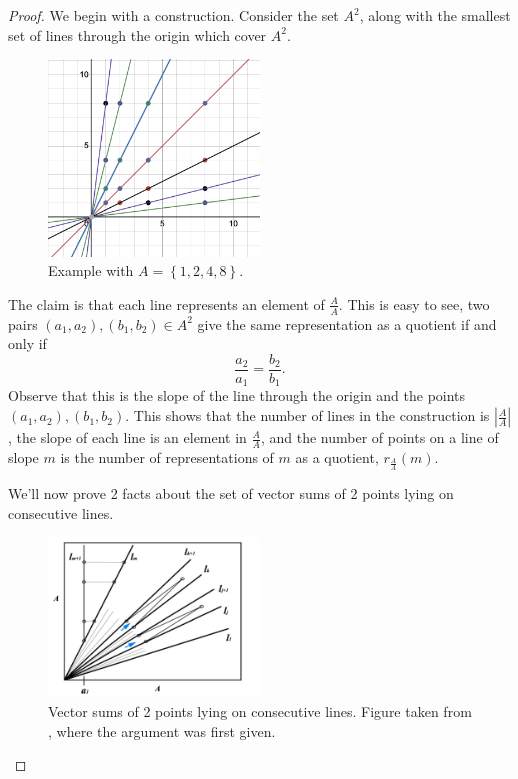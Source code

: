 \documentclass[12pt,reqno]{amsart}
\begin{document}
\begin{proof}

We begin with a construction. Consider the set \(A^{2}\), along with the smallest set of lines
through the origin which cover \(A^{2}\).

\begin{figure}[h]
    \centering
    \includegraphics[width=0.5\textwidth]{Sol1.png}
    \caption{Example with \(A = \left\{ 1,2,4,8 \right\} \).}
\end{figure}

The claim is that each line represents an element of \(\frac{A}{A} \). This is
easy to see, two pairs \((a_1,a_2),(b_1,b_2) \in A^{2}\) give the same representation as a quotient if
and only if
\[
    \frac{a_2}{a_1} = \frac{b_2}{b_1} 
.\]
Observe that this is the slope of the line through the origin and the points \((a_1,a_2), (b_1,b_2)\).
This shows that the number of lines in the construction is \(\left\lvert \frac{A}{A}  \right\rvert \), the slope
of each line is an element in \(\frac{A}{A} \), and the number of points on a line
of slope \(m\) is the number of representations of \(m\) as a quotient, \(r_{\frac{A}{A} } (m)\).

We'll now prove 2 facts about the set of vector sums of 2 points lying on consecutive lines.

\begin{figure}[h]
    \centering
    \includegraphics[width=0.5\textwidth]{sol2.png}
    \caption{Vector sums of 2 points lying on consecutive lines. Figure taken from \cite{Solymosi}, where the argument was first given.}
    \label{fig:solymosi}
\end{figure}


\end{proof}
\end{document}
